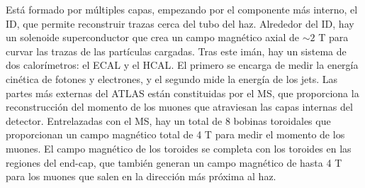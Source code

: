 Está formado por múltiples capas, empezando por el componente más interno, el \acf{ID}, que permite reconstruir trazas cerca del tubo del haz. Alrededor del \ac{ID}, hay un solenoide superconductor que crea un campo magnético axial de \(\sim 2\) T para curvar las trazas de las partículas cargadas.
Tras este imán, hay un sistema de dos calorímetros: el \acf{ECAL} y el \acf{HCAL}. El primero se encarga de medir la energía cinética de fotones y electrones, y el segundo mide la energía de los jets.
Las partes más externas del \ac{ATLAS} están constituidas por el \acf{MS}, que proporciona la reconstrucción del momento de los muones que atraviesan las capas internas del detector. Entrelazadas con el \ac{MS}, hay un total de 8 bobinas toroidales que proporcionan un campo magnético total de 4 T para medir el momento de los muones. El campo magnético de los toroides se completa con los toroides en las regiones del end-cap, que también generan un campo magnético de hasta 4 T para los muones que salen en la dirección más próxima al haz.





